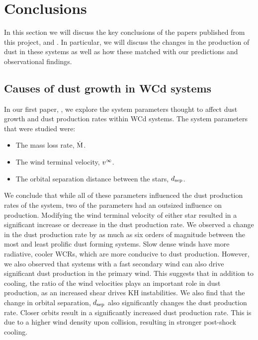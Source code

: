 \section{Conclusions}

In this section we will discuss the key conclusions of the papers published from this project, \emph{\firstpapertitle{}} \parencite{eatsonExplorationDustGrain2022} and \emph{\secondpapertitle{}} \parencite{eatsonExploringDustGrowth2022}.
In particular, we will discuss the changes in the production of dust in these systems as well as how these matched with our predictions and observational findings.

\subsection{Causes of dust growth in WCd systems}

In our first paper, \emph{\firstpapertitle} \parencite{eatsonExplorationDustGrain2022}, we explore the system parameters thought to affect dust growth and dust production rates within WCd systems.
The system parameters that were studied were:

\begin{itemize}
  \item The mass loss rate, $\dot{\text{M}}$.
  \item The wind terminal velocity, $v^\infty$.
  \item The orbital separation distance between the stars, $d_\text{sep}$.
\end{itemize}

\noindent
We conclude that while all of these parameters influenced the dust production rates of the system, two of the parameters had an outsized influence on production.
Modifying the wind terminal velocity of either star resulted in a significant increase or decrease in the dust production rate.
We observed a change in the dust production rate by as much as six orders of magnitude between the most and least prolific dust forming systems.
Slow dense winds have more radiative, cooler WCRs, which are more conducive to dust production.
However, we also observed that systems with a fast secondary wind can also drive significant dust production in the primary wind.
This suggests that in addition to cooling, the ratio of the wind velocities plays an important role in dust production, as an increased shear drives KH instabilities.
We also find that the change in orbital separation, $d_\text{sep}$ also significantly changes the dust production rate.
Closer orbits result in a significantly increased dust production rate.
This is due to a higher wind density upon collision, resulting in stronger post-shock cooling.

